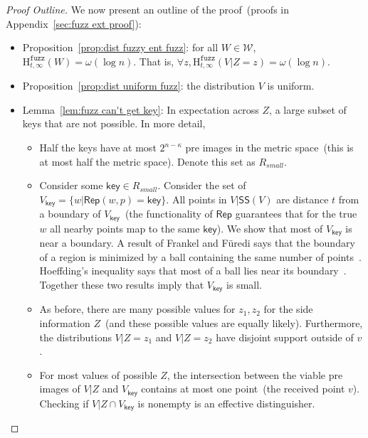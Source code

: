 \documentclass[11pt]{article}
\newcommand{\apref}[1]{\mbox{Appendix~\ref{#1}}}
\newcommand{\lemref}[1]{\mbox{Lemma~\ref{#1}}}
\newcommand{\propref}[1]{\mbox{Proposition~\ref{#1}}}
\newcommand{\class}[1]{{\ensuremath{\mathsf{#1}}}}
\newcommand{\key}{\ensuremath{\class{key}}\xspace}
\newcommand{\gen}{\ensuremath{\class{Gen}}\xspace}
\newcommand{\rep}{\ensuremath{\class{Rep}}\xspace}
\newcommand{\sketch}{\ensuremath{\class{SS}}\xspace}
\newcommand{\Hfuzz}{\mathrm{H}^{\mathtt{fuzz}}_{t,\infty}}
\begin{document}
\begin{proof}[Proof Outline]
We now present an outline of the proof~(proofs in \apref{sec:fuzz ext proof}):
\begin{itemize}
\item \propref{prop:dist fuzzy ent fuzz}: for all $W\in \mathcal{W}$, $\Hfuzz(W) = \omega (\log n)$. That is, $\forall z, \Hfuzz(V | Z=z) = \omega(\log n)$.
\item \propref{prop:dist uniform fuzz}: the distribution $V$ is uniform.
\item \lemref{lem:fuzz can't get key}: In expectation across $Z$, a large subset of keys that are not possible.  In more detail,
\begin{itemize}
\item Half the keys have at most $2^{n- \kappa}$ pre images in the metric space~(this is at most half the metric space).  Denote this set as $R_{small}$.  
\item Consider some $\key \in R_{small}$.  %
Consider the set of $V_{\key } = \{w | \rep(w, p) = \key \}$.  All points in $V | \sketch(V)$ are distance $t$ from a boundary of $V_\key$~(the functionality of $\rep$ guarantees that for the true $w$ all nearby points map to the same $\key$).  We show that most of $V_\key$ is near a boundary.  A result of Frankel and F{\"u}redi says that the boundary of a region is minimized by a ball containing the same number of points~\cite{frankl1981short}.  Hoeffding's inequality says that most of a ball lies near its boundary~\cite{hoeffding1963probability}.  Together these two results imply that $V_\key$ is small.
\item As before, there are many possible values for $z_1, z_2$ for the side information $Z$~(and these possible values are equally likely).  Furthermore, the distributions $V|Z=z_1 $ and $V| Z=z_2$ have disjoint support outside of $v$.
\item For most values of possible $Z$, the intersection between the viable pre images of $V|Z$ and $V_\key$ contains at most one point~(the received point $v$).  Checking if $V|Z \cap V_{\key}$ is nonempty is an effective distinguisher.
\end{itemize}
\end{itemize}

\end{proof}
\end{document}

